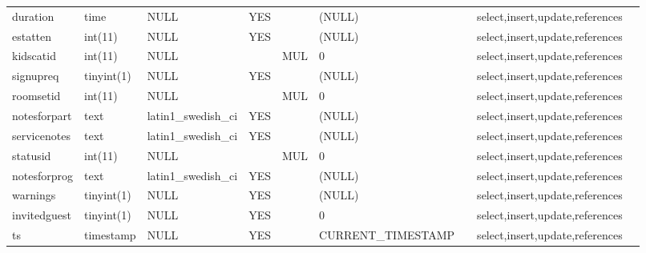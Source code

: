 \documentclass[tablesignature,landscape]{scrartcl}
\begin{document}
\begin{longtable}{|l|l|l|l|l|l|l|l|l|}
 duration        &  time          &  NULL                     &  YES   &       &  (NULL)                &                     &  select,insert,update,references  &           \\
 estatten        &  int(11)       &  NULL                     &  YES   &       &  (NULL)                &                     &  select,insert,update,references  &           \\
 kidscatid       &  int(11)       &  NULL                     &        &  MUL  &  0                     &                     &  select,insert,update,references  &           \\
 signupreq       &  tinyint(1)    &  NULL                     &  YES   &       &  (NULL)                &                     &  select,insert,update,references  &           \\
 roomsetid       &  int(11)       &  NULL                     &        &  MUL  &  0                     &                     &  select,insert,update,references  &           \\
 notesforpart    &  text          &  latin1\_{}swedish\_{}ci  &  YES   &       &  (NULL)                &                     &  select,insert,update,references  &           \\
 servicenotes    &  text          &  latin1\_{}swedish\_{}ci  &  YES   &       &  (NULL)                &                     &  select,insert,update,references  &           \\
 statusid        &  int(11)       &  NULL                     &        &  MUL  &  0                     &                     &  select,insert,update,references  &           \\
 notesforprog    &  text          &  latin1\_{}swedish\_{}ci  &  YES   &       &  (NULL)                &                     &  select,insert,update,references  &           \\
 warnings        &  tinyint(1)    &  NULL                     &  YES   &       &  (NULL)                &                     &  select,insert,update,references  &           \\
 invitedguest    &  tinyint(1)    &  NULL                     &  YES   &       &  0                     &                     &  select,insert,update,references  &           \\
 ts              &  timestamp     &  NULL                     &  YES   &       &  CURRENT\_{}TIMESTAMP  &                     &  select,insert,update,references  &           \\
\hline
\end{longtable}
\end{document}
